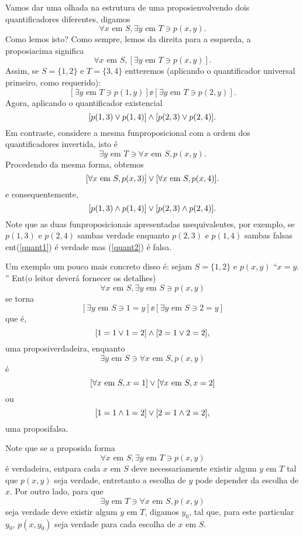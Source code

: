 Vamos dar uma olhada na estrutura de uma proposi\cao envolvendo dois quantificadores diferentes, digamos
\[
\forall x \textrm{ em } S, \exists y \textrm{ em } T \ni  p(x,y).
\]
Como lemos isto? Como sempre, lemos da direita para a esquerda, a proposi\cao acima significa
\[
\forall x \textrm{ em } S, [\exists y \textrm{ em } T \ni  p(x,y)].
\]
Assim, se $S=\{1,2\}$ e $T=\{3,4\}$ ent\ao teremos (aplicando o quantificador universal primeiro, como requerido):
\[
[\exists y \textrm{ em } T \ni  p(1,y)]\ee[\exists y \textrm{ em } T \ni  p(2,y)].
\]
Agora, aplicando o quantificador existencial
\begin{equation}\label{quant1}
[p(1,3)\vee p(1,4)]\wedge[p(2,3)\vee p(2,4)].
\end{equation}
Em contraste, considere a mesma fun\cao proposicional com a ordem dos quantificadores invertida, isto \'e
\[
\exists y \textrm{ em } T \ni \forall x \textrm{ em } S, p(x,y).
\]
Procedendo da mesma forma, obtemos
\[
[\forall x \textrm{ em } S, p(x,3)]\vee[\forall x \textrm{ em } S, p(x,4)].
\]
e consequentemente,
\begin{equation}\label{quant2}
[p(1,3)\wedge p(1,4)]\vee[p(2,3)\wedge p(2,4)].
\end{equation}
Note que as duas fun\coes proposicionais apresentadas n\ao s\ao equivalentes, por exemplo, se $p(1,3)$ e $p(2,4)$ s\ao ambas verdade enquanto $p(2,3)$ e $p(1,4)$ s\ao ambas falsas ent\ao (\ref{quant1}) \'e verdade mas (\ref{quant2}) \'e falsa.

Um exemplo um pouco mais concreto disso \'e: sejam $S=\{1,2\}$ e $p(x,y)$ ``$x=y.$'' Ent\ao (o leitor dever\'a fornecer os detalhes)
\[
\forall x \textrm{ em } S, \exists y \textrm{ em } S \ni  p(x,y)
\]
se torna
\[
[\exists y \textrm{ em } S \ni  1=y]\ee[\exists y \textrm{ em } S \ni  2=y]
\]
que \'e,
\[
[1=1 \vee 1=2]\wedge[2=1 \vee 2=2],
\]
uma proposi\cao verdadeira, enquanto
\[
\exists y \textrm{ em } S \ni \forall x \textrm{ em } S, p(x,y)
\]
\'e
\[
[\forall x \textrm{ em } S, x=1]\vee[\forall x \textrm{ em } S, x=2]
\]
ou
\[
[1=1 \wedge 1=2]\vee[2=1 \wedge 2=2],
\]
uma proposi\cao falsa.

Note que se a proposi\cao da forma
\[
\forall x \textrm{ em } S, \exists y \textrm{ em } T \ni  p(x,y)
\]
\'e verdadeira, ent\ao para cada $x$ em $S$ deve necessariamente existir algum $y$ em $T$ tal que $p(x,y)$ seja verdade, entretanto a escolha de $y$ pode depender da escolha de $x$. Por outro lado, para que
\[
\exists y \textrm{ em } T \ni \forall x \textrm{ em } S, p(x,y)
\]
seja verdade deve existir algum $y$ em $T$, digamos $y_0$, tal que, para este particular $y_0$, $p(x,y_0)$ seja verdade para cada escolha de $x$ em $S$.


